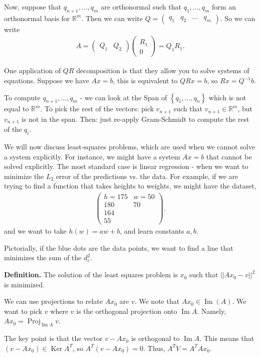 \documentclass{article}
\newcommand{\mat}[1]{\begin{pmatrix}#1\end{pmatrix}}
\newcommand{\RR}{\mathbb{R}}
\DeclareMathOperator{\Ker}{Ker}
\DeclareMathOperator{\Ima}{Im}
\DeclareMathOperator{\Ima}{Im}
\DeclareMathOperator{\Proj}{Proj}
\begin{document}
Now, suppose that $q_{n+1}, \dots, q_m$ are orthonormal such that $q_1, \dots, q_m$ form an orthonormal basis for $\RR^m$.  Then we can write $Q = \mat{q_1 & q_2 & \dots & q_m}$.  So we can write 
\begin{align*}
  A = \mat{Q_1 & Q_2} \mat{R_1 \\ 0} = Q_1 R_1.
\end{align*}

One application of $QR$ decomposition is that they allow you to solve systems of equations.  Suppose we have $Ax = b$, this is equivalent to $QR x = b$, so $Rx = Q^{-1} b$.

To compute $q_{n+1}, \dots, q_m$ - we can look at the Span of $\left\{ q_1, \dots, q_n  \right\}$ which is not equal to $\RR^m$.   To pick the rest of the vectors: pick $v_{n+1}$ such that $v_{n+1} \in \RR^m$, but $v_{n+1}$ is not in the span.  Then: just re-apply Gram-Schmidt to compute the rest of the $q_i$.

We will now discuss least-squares problems, which are used when we cannot solve a system explicitly.  For instance, we might have a system $Ax = b$ that cannot be solved explicitly.  The most standard case is linear regression - when we want to minimize the $L_2$ error of the predictions vs. the data.  For example, if we are trying to find a function that takes heights to weights, we might have the dataset,
\begin{align*}
  \mat{h = 175 & w = 50 \\ 180 & 70 \\ 164 \\ 55}.
\end{align*}
and we want to take $h(w) = aw + b$, and learn constants $a, b$.

Pictorially, if the blue dots are the data points, we want to find a line that minimizes the sum of the $d_i^2$.

{\bf Definition.} The solution of the least squares problem is $x_0$ such that $||A x_0 - v||^2$ is minimized.

We can use projections to relate $Ax_0$ are $v$.  We note that $Ax_0 \in \Ima (A)$.  We want to pick $v$ where $v$ is the orthogonal projection onto $\Ima A$.    Namely, $A x_0 = \Proj_{\Ima A} v$.

The key point is that the vector $v - A x_0$ is orthogonal to $\Ima A$.  This means that $(v - A x_0) \in \Ker A^T$, so $A^T (v - A x_0) = 0$.  Thus, $A^T V = A^T A x_0$.
\end{document}
